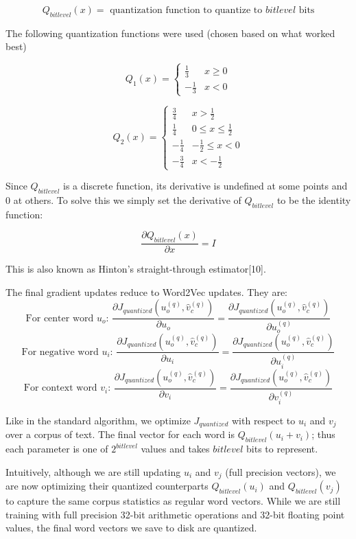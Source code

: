 \documentclass{article} %
\begin{document}
$$
Q_{bitlevel}(x) = \mbox{ quantization function to quantize to } bitlevel \mbox{ bits}
$$

The following quantization functions were used (chosen based on what worked best)

\[
Q_1(x) =
\begin{cases}
  \frac{1}{3} & x \geq 0\\
  -\frac{1}{3} & x < 0
\end{cases}
\]


\[
Q_2(x) =
\begin{cases}
  \frac{3}{4} & x > \frac{1}{2}\\
  \frac{1}{4} & 0 \leq x \leq \frac{1}{2}\\
  -\frac{1}{4} & -\frac{1}{2} \leq x < 0\\
  -\frac{3}{4} & x < -\frac{1}{2}
\end{cases}
\]

Since $Q_{bitlevel}$ is a discrete function, its derivative is
undefined at some points and 0 at others. To solve this we simply set
the derivative of $Q_{bitlevel}$ to be the identity function:

$$
\frac{\partial Q_{bitlevel}(x)}{\partial x} = I
$$

This is also known as Hinton's straight-through estimator[10].

The final gradient updates reduce to Word2Vec updates. They are:
$$
\mbox{For center word } u_o \textbf{: } \frac{\partial J_{quantized} (u^{(q)}_o, \hat{v}^{(q)}_c)}{\partial u_o} = \frac{\partial J_{quantized} (u^{(q)}_o, \hat{v}^{(q)}_c)}{\partial u^{(q)}_o}
$$
$$
\mbox{For negative word } u_i \textbf{: } \frac{\partial J_{quantized} (u^{(q)}_o, \hat{v}^{(q)}_c)}{\partial u_i} = \frac{\partial J_{quantized} (u^{(q)}_o, \hat{v}^{(q)}_c)}{\partial u^{(q)}_i}
$$
$$
\mbox{For context word } v_i \textbf{: } \frac{\partial J_{quantized} (u^{(q)}_o, \hat{v}^{(q)}_c)}{\partial v_i} = \frac{\partial J_{quantized} (u^{(q)}_o, \hat{v}^{(q)}_c)}{\partial v^{(q)}_i}
$$

Like in the standard algorithm, we optimize $J_{quantized}$ with
respect to $u_i$ and $v_j$ over a corpus of text. The final vector for
each word is $Q_{bitlevel}(u_i + v_i)$; thus each parameter is one of
$2^{bitlevel}$ values and takes $bitlevel$ bits to represent.

Intuitively, although we are still updating $u_i$ and $v_j$ (full
precision vectors), we are now optimizing their quantized
counterparts $Q_{bitlevel}(u_i)$ and $Q_{bitlevel}(v_j)$ to capture
the same corpus statistics as regular word vectors. While we are still
training with full precision 32-bit arithmetic operations and 32-bit floating
point values, the final word vectors we save to disk are
quantized.
\end{document}

